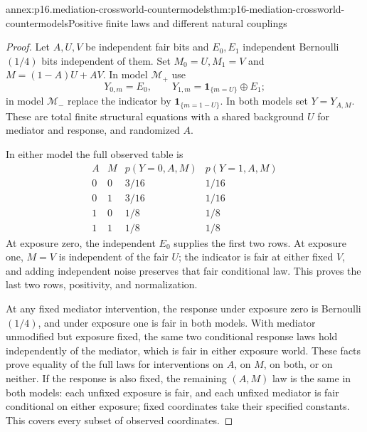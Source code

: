 \begin{annexitem}{annex:p16.mediation-crossworld-countermodels}{thm:p16-mediation-crossworld-countermodels}{Positive finite laws and different natural couplings}
\begin{proof}
Let \(A,U,V\) be independent fair bits and \(E_0,E_1\) independent
Bernoulli\((1/4)\) bits independent of them. Set \(M_0=U,M_1=V\)
and \(M=(1-A)U+AV\). In model \(\mathcal M_+\) use
\[
 Y_{0,m}=E_0,\qquad Y_{1,m}=\mathbf1_{\{m=U\}}\oplus E_1;
\]
in model \(\mathcal M_-\) replace the indicator by
\(\mathbf1_{\{m=1-U\}}\). In both models set \(Y=Y_{A,M}\).
These are total finite structural equations with a shared background
\(U\) for mediator and response, and randomized \(A\).

In either model the full observed table is
\[
\begin{array}{cc|cc}
 A&M&p(Y=0,A,M)&p(Y=1,A,M)\\\hline
 0&0&3/16&1/16\\0&1&3/16&1/16\\
 1&0&1/8&1/8\\1&1&1/8&1/8
\end{array}
\]
At exposure zero, the independent \(E_0\) supplies the first two
rows. At exposure one, \(M=V\) is independent of the fair \(U\);
the indicator is fair at either fixed \(V\), and adding independent
noise preserves that fair conditional law. This proves the last two
rows, positivity, and normalization.

At any fixed mediator intervention, the response under exposure zero
is Bernoulli\((1/4)\), and under exposure one is fair in both models.
With mediator unmodified but exposure fixed, the same two conditional
response laws hold independently of the mediator, which is fair in
either exposure world. These facts prove equality of the full laws for
interventions on \(A\), on \(M\), on both, or on neither. If the
response is also fixed, the remaining \((A,M)\) law is the same in
both models: each unfixed exposure is fair, and each unfixed mediator
is fair conditional on either exposure; fixed coordinates take their
specified constants. This covers every subset of observed coordinates.


\end{proof}
\end{annexitem}
